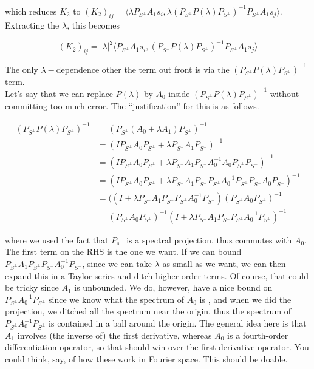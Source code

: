 \documentclass[12pt]{article}
\begin{document}
which reduces $K_2$ to $(K_2)_{ij} = \langle \lambda P_{S^\perp} A_1 s_i, \lambda ( P_{S^\perp} P(\lambda) P_{S^\perp})^{-1} P_{S^\perp} A_1 s_j \rangle$. Extracting the $\lambda$, this becomes 

\[
(K_2)_{ij} = |\lambda|^2 \langle P_{S^\perp} A_1 s_i, ( P_{S^\perp} P(\lambda) P_{S^\perp})^{-1} P_{S^\perp} A_1 s_j \rangle
\]

The only $\lambda-$dependence other the term out front is via the $( P_{S^\perp} P(\lambda) P_{S^\perp})^{-1}$ term.\\

Let's say that we can replace $P(\lambda)$ by $A_0$ inside $( P_{S^\perp} P(\lambda) P_{S^\perp})^{-1}$ without committing too much error. The ``justification'' for this is as follows.

\begin{align*}
( P_{S^\perp} P(\lambda) P_{S^\perp})^{-1} 
&= ( P_{S^\perp} (A_0 + \lambda A_1) P_{S^\perp})^{-1} \\ 
&= ( I P_{S^\perp} A_0 P_{S^\perp} + \lambda P_{S^\perp} A_1 P_{S^\perp})^{-1} \\
&= ( I P_{S^\perp} A_0 P_{S^\perp} + \lambda P_{S^\perp} A_1 P_{S^\perp}A_0^{-1} A_0 P_{S^\perp}P_{S^\perp})^{-1} \\
&= ( I P_{S^\perp} A_0 P_{S^\perp} + \lambda P_{S^\perp} A_1 P_{S^\perp}P_{S^\perp}A_0^{-1} P_{S^\perp} P_{S^\perp}A_0 P_{S^\perp})^{-1} \\
&= (( I + \lambda P_{S^\perp} A_1 P_{S^\perp}P_{S^\perp}A_0^{-1}P_{S^\perp} )(P_{S^\perp}A_0 P_{S^\perp})^{-1} \\
&= (P_{S^\perp}A_0 P_{S^\perp})^{-1} ( I + \lambda P_{S^\perp} A_1 P_{S^\perp}P_{S^\perp}A_0^{-1}P_{S^\perp} )^{-1}
\end{align*}

where we used the fact that $P_{s^\perp}$ is a spectral projection, thus commutes with $A_0$. The first term on the RHS is the one we want. If we can bound $P_{S^\perp} A_1 P_{S^\perp}P_{S^\perp}A_0^{-1}P_{S^\perp}$, since we can take $\lambda$ as small as we want, we can then expand this in a Taylor series and ditch higher order terms. Of course, that could be tricky since $A_1$ is unbounded. We do, however, have a nice bound on $P_{S^\perp}A_0^{-1}P_{S^\perp}$ since we know what the spectrum of $A_0$ is , and when we did the projection, we ditched all the spectrum near the origin, thus the spectrum of $P_{S^\perp}A_0^{-1}P_{S^\perp}$ is contained in a ball around the origin. The general idea here is that $A_1$ involves (the inverse of) the first derivative, whereas $A_0$ is a fourth-order differentiation operator, so that should win over the first derivative operator. You could think, say, of how these work in Fourier space. This should be doable.\\
\end{document}
